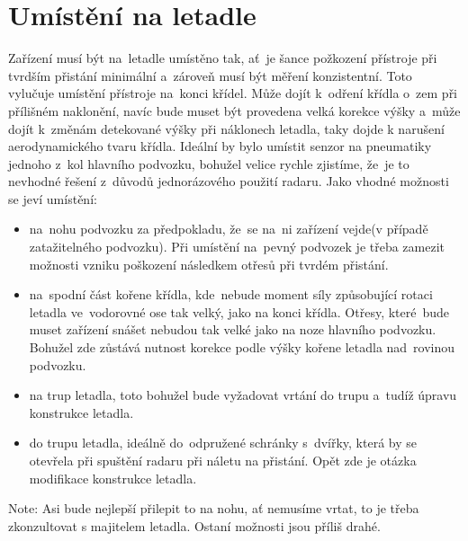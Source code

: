 	\section{Umístění na letadle}\label{navrhReseni::umisteniNaLetadle}
		Zařízení musí být na~letadle umístěno tak, ať~je šance požkození přístroje při tvrdším přistání minimální a~zároveň musí být měření konzistentní. Toto vylučuje umístění přístroje na~konci křídel. Může dojít k~odření křídla o~zem při přílišném naklonění, navíc bude muset být provedena velká korekce výšky a~může dojít k~změnám detekované výšky při náklonech letadla, taky dojde k narušení aerodynamického tvaru křídla. Ideální by bylo umístit senzor na pneumatiky jednoho z~kol hlavního podvozku, bohužel velice rychle zjistíme, že~je to nevhodné řešení z~důvodů jednorázového použití radaru. Jako vhodné možnosti se jeví umístění:
		\begin{itemize}
			\item na~nohu podvozku za předpokladu, že~se na~ni zařízení vejde(v případě zatažitelného podvozku). Při umístění na~pevný podvozek je třeba zamezit možnosti vzniku poškození následkem otřesů při tvrdém přistání. 
			\item na~spodní část kořene křídla, kde~nebude moment síly způsobující rotaci letadla ve~vodorovné ose tak velký, jako na konci křídla. Otřesy, které~bude muset zařízení snášet nebudou tak velké jako na noze hlavního podvozku. Bohužel zde zůstává nutnost korekce podle výšky kořene letadla nad~rovinou podvozku.
			\item na trup letadla, toto bohužel bude vyžadovat vrtání do trupu a~tudíž úpravu konstrukce letadla.
			\item do trupu letadla, ideálně do~odpružené schránky s~dvířky, která by se otevřela při spuštění radaru při náletu na přistání. Opět zde je otázka modifikace konstrukce letadla.
		\end{itemize} 
		Note: Asi bude nejlepší přilepit to na nohu, ať nemusíme vrtat, to je třeba zkonzultovat s majitelem letadla. Ostaní možnosti jsou příliš drahé.


